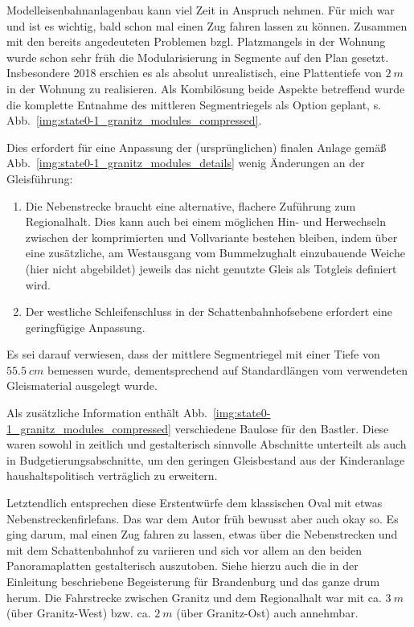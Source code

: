 Modelleisenbahnanlagenbau kann viel Zeit in Anspruch nehmen.
F\"ur mich war und ist es wichtig, bald schon mal einen Zug fahren lassen zu k\"onnen.
Zusammen mit den bereits angedeuteten Problemen bzgl. Platzmangels in der Wohnung wurde schon sehr fr\"uh die Modularisierung in Segmente auf den Plan gesetzt.
Insbesondere 2018 erschien es als absolut unrealistisch, eine Plattentiefe von $2~m$ in der Wohnung zu realisieren.
Als Kombil\"osung beide Aspekte betreffend wurde die komplette Entnahme des mittleren Segmentriegels als Option geplant, s. Abb.~\ref{img:state0-1_granitz_modules_compressed}.

Dies erfordert f\"ur eine Anpassung der (urspr\"unglichen) finalen Anlage gem\"a{\ss} Abb.~\ref{img:state0-1_granitz_modules_details} wenig \"Anderungen an der Gleisf\"uhrung:
\begin{enumerate}
	\item Die Nebenstrecke braucht eine alternative, flachere Zuf\"uhrung zum Regionalhalt.
	Dies kann auch bei einem m\"oglichen Hin- und Herwechseln zwischen der komprimierten und Vollvariante bestehen bleiben, indem \"uber eine zus\"atzliche, am Westausgang vom Bummelzughalt einzubauende Weiche (hier nicht abgebildet) jeweils das nicht genutzte Gleis als Totgleis definiert wird.
	\item Der westliche Schleifenschluss in der Schattenbahnhofsebene erfordert eine geringf\"ugige Anpassung.
\end{enumerate}
Es sei darauf verwiesen, dass der mittlere Segmentriegel mit einer Tiefe von $55.5~cm$ bemessen wurde, dementsprechend auf Standardl\"angen vom verwendeten Gleismaterial ausgelegt wurde.

Als zus\"atzliche Information enth\"alt Abb.~\ref{img:state0-1_granitz_modules_compressed} verschiedene Baulose f\"ur den Bastler.
Diese waren sowohl in zeitlich und gestalterisch sinnvolle Abschnitte unterteilt als auch in Budgetierungsabschnitte, um den geringen Gleisbestand aus der Kinderanlage haushaltspolitisch vertr\"aglich zu erweitern.

Letztendlich entsprechen diese Erstentw\"urfe dem klassischen Oval mit etwas Nebenstreckenfirlefans.
Das war dem Autor fr\"uh bewusst aber auch okay so.
Es ging darum, mal einen Zug fahren zu lassen, etwas \"uber die Nebenstrecken und mit dem Schattenbahnhof zu variieren und sich vor allem an den beiden Panoramaplatten gestalterisch auszutoben.
Siehe hierzu auch die in der Einleitung beschriebene Begeisterung f\"ur Brandenburg und das ganze drum herum.
Die Fahrstrecke zwischen Granitz und dem Regionalhalt war mit ca. $3~m$ (\"uber Granitz-West) bzw. ca. $2~m$ (\"uber Granitz-Ost) auch annehmbar.


